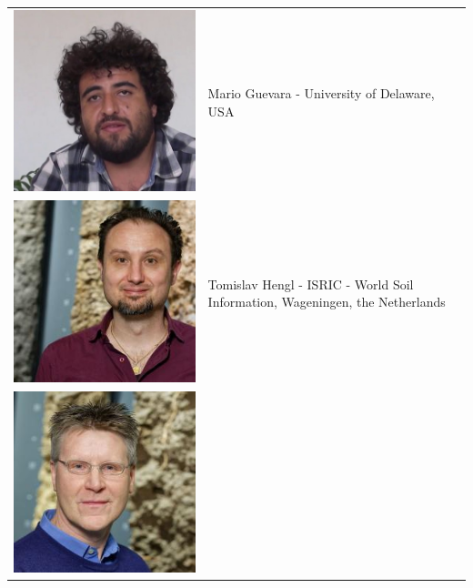 \documentclass[10pt,b5paper,]{book}
\theoremstyle{definition}
\theoremstyle{definition}
\theoremstyle{definition}
\theoremstyle{remark}
\begin{document}
\begin{longtable}[]{@{}ll@{}}
\begin{minipage}[t]{0.11\columnwidth}
\includegraphics{contrAuthors/Guevara.jpg}\strut
\end{minipage} & \begin{minipage}[t]{0.83\columnwidth}\raggedright
Mario Guevara - University of Delaware, USA\strut
\end{minipage}\tabularnewline
\begin{minipage}[t]{0.11\columnwidth}\raggedright
\includegraphics{contrAuthors/Hengl.jpg}\strut
\end{minipage} & \begin{minipage}[t]{0.83\columnwidth}\raggedright
Tomislav Hengl - ISRIC - World Soil Information, Wageningen, the
Netherlands\strut
\end{minipage}\tabularnewline
\begin{minipage}[t]{0.11\columnwidth}\raggedright
\includegraphics{contrAuthors/Heuvelink.jpg}\strut

\end{minipage}
\end{longtable}
\end{document}
